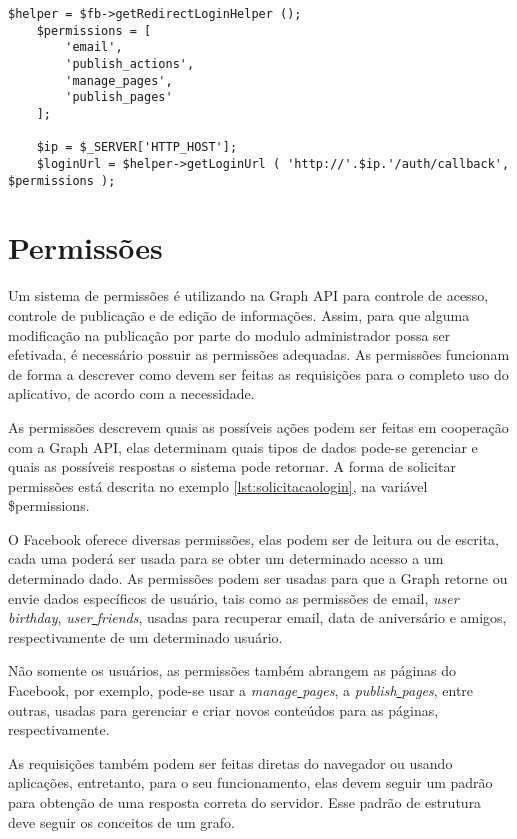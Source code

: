 \begin{lstlisting}[caption={Solicitação de Login},label={lst:solicitacaologin}]
	$helper = $fb->getRedirectLoginHelper ();
	$permissions = [
		'email',
		'publish_actions',
		'manage_pages',
		'publish_pages'
	];

	$ip = $_SERVER['HTTP_HOST'];
	$loginUrl = $helper->getLoginUrl ( 'http://'.$ip.'/auth/callback', $permissions );
\end{lstlisting}

\section{Permissões}
Um sistema de permissões é utilizando na Graph API para controle de acesso, controle de publicação e de edição de informações. Assim, para que alguma modificação na publicação por parte do modulo administrador possa ser efetivada, é necessário possuir as permissões adequadas. As permissões funcionam de forma a descrever como devem ser feitas as requisições para o completo uso do aplicativo, de acordo com a necessidade.

As permissões descrevem quais as possíveis ações podem ser feitas em cooperação com a Graph API, elas determinam quais tipos de dados pode-se gerenciar e quais as possíveis respostas o sistema pode retornar. A forma de solicitar permissões está descrita no exemplo \ref{lst:solicitacaologin}, na variável \$permissions.

O Facebook oferece diversas permissões, elas podem ser de leitura ou de escrita, cada uma poderá ser usada para se obter um determinado acesso a um determinado dado. As permissões podem ser usadas para que a Graph retorne ou envie dados específicos de usuário, tais como as permissões de email, \textit{user\underline{{ }}birthday}, \textit{user\underline{{ }}friends}, usadas para recuperar email, data de aniversário e amigos, respectivamente de um determinado usuário.

Não somente os usuários, as permissões também abrangem as páginas do Facebook, por exemplo, pode-se usar a \textit{manage\underline{{ }}pages}, a \textit{publish\underline{{ }}pages}, entre outras, usadas para gerenciar e criar novos conteúdos para as páginas, respectivamente.

As requisições também podem ser feitas diretas do navegador ou usando aplicações, entretanto, para o seu funcionamento, elas devem seguir um padrão para obtenção de uma resposta correta do servidor. Esse padrão de estrutura deve seguir os conceitos de um grafo.

